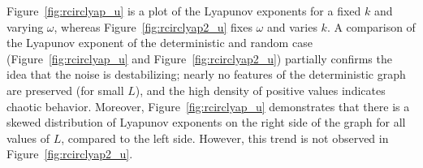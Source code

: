 Figure~\ref{fig:rcirclyap_u} is a plot of the Lyapunov
exponents for a fixed $k$ and varying $\omega$, whereas
Figure~\ref{fig:rcirclyap2_u} fixes $\omega$ and varies $k$. A comparison of the Lyapunov exponent of the deterministic and random
case (Figure~\ref{fig:rcirclyap_u} and Figure~\ref{fig:rcirclyap2_u})
partially confirms the idea that the noise is destabilizing; nearly no
features of the deterministic graph are preserved (for small $L$), and the high
density of positive values indicates chaotic
behavior. Moreover,
Figure~\ref{fig:rcirclyap_u} demonstrates that there is a skewed
distribution of Lyapunov exponents on the right side of the graph for
all values of $L$, compared to the left side. However, this trend is not observed in Figure~\ref{fig:rcirclyap2_u}.


